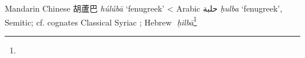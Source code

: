 \begin{etymology}\label{ety:huluba}
Mandarin Chinese {胡蘆巴} \textit{húlúbā} `fenugreek'
< Arabic {حلبة} \textit{ḥulba} `fenugreek', Semitic; cf. cognates Classical Syriac ; Hebrew ‎ \textit{ḥilbā}\footnote{}
\end{etymology}